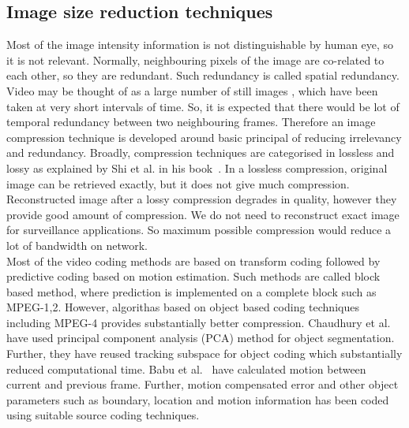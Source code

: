 \subsection{Image size reduction techniques}
\indent Most of the image intensity information is not distinguishable
by human eye, so it is not relevant. Normally, neighbouring pixels of
the image are co-related to each other, so they are redundant. Such
redundancy is called spatial redundancy. Video may be thought of as a
large number of still images , which have been taken at very short
intervals of time. So, it is expected that there would be lot of
temporal redundancy between two neighbouring frames.  Therefore an image
compression technique is developed around basic principal of reducing
irrelevancy and redundancy. Broadly, compression techniques are
categorised in lossless and lossy as explained by Shi et al. in his
book~\cite{6}. In a lossless compression, original image can be
retrieved exactly, but it does not give much compression.  Reconstructed
image after a lossy compression degrades in quality, however they
provide good amount of compression. We do not need to reconstruct exact
image for surveillance applications. So maximum possible compression
would reduce a lot of bandwidth on network.\\
\indent Most of the video coding methods are based on transform coding
followed by predictive coding based on motion estimation. Such methods
are called block based method, where prediction is implemented on a
complete block such as  MPEG-1,2. However, algorithas based
on object based coding techniques~\cite{7, 8} including MPEG-4 provides
substantially better compression. Chaudhury et al.~\cite{7} have used
principal component analysis (PCA) method for object
segmentation. Further, they have reused tracking subspace for object
coding which substantially reduced computational time. Babu et al.~\cite{8}
have calculated motion between current and previous frame.
Further, motion compensated error and other object parameters such as
boundary, location and motion information has been coded using suitable
source coding techniques.

